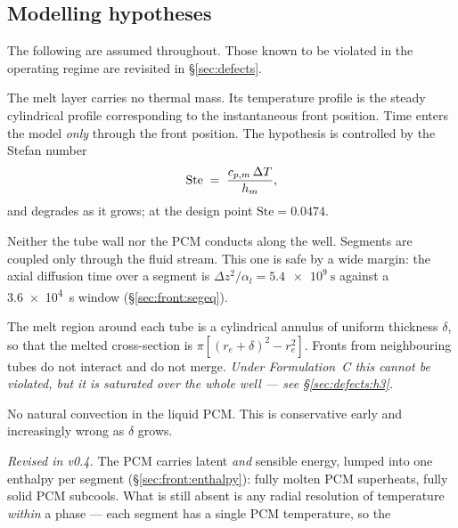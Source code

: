 \subsection{Modelling hypotheses}
\label{sec:overview:hypotheses}

The following are assumed throughout. Those known to be violated in the
operating regime are revisited in \S\ref{sec:defects}.

\begin{description}[leftmargin=1.6em,itemsep=2pt]
\item[H1 --- Quasi-steady conduction.] The melt layer carries no thermal mass.
  Its temperature profile is the steady cylindrical profile corresponding to the
  instantaneous front position. Time enters the model \emph{only} through the
  front position. The hypothesis is controlled by the Stefan number
  \begin{equation}
    \mathrm{Ste} \;=\; \frac{c_{p,m}\,\Delta T}{h_{m}},
    \label{eq:stefan-number}
  \end{equation}
  and degrades as it grows; at the design point $\mathrm{Ste}=0.0474$.
\item[H2 --- No axial conduction.] Neither the tube wall nor the PCM conducts
  along the well. Segments are coupled only through the fluid stream. This one
  is safe by a wide margin: the axial diffusion time over a segment is
  $\Delta z^{2}/\alpha_{l}=\SI{5.4e9}{\second}$ against a
  \SI{3.6e4}{\second} window (\S\ref{sec:front:segeq}).
\item[H3 --- Concentric annular front.] The melt region around each tube is a
  cylindrical annulus of uniform thickness $\delta$, so that the melted
  cross-section is $\pi[(r_e+\delta)^2-r_e^2]$. Fronts from neighbouring tubes
  do not interact and do not merge. \emph{Under Formulation~C this cannot be
  violated, but it is saturated over the whole well --- see
  \S\ref{sec:defects:h3}.}
\item[H4 --- Conduction only in the melt.] No natural convection in the liquid
  PCM. This is conservative early and increasingly wrong as $\delta$ grows.
\item[H5 --- Enthalpy state, no radial resolution.] \emph{Revised in v0.4.} The
  PCM carries latent \emph{and} sensible energy, lumped into one enthalpy per
  segment (\S\ref{sec:front:enthalpy}): fully molten PCM superheats, fully solid
  PCM subcools. What is still absent is any radial resolution of temperature
  \emph{within} a phase --- each segment has a single PCM temperature, so the

\end{description}
